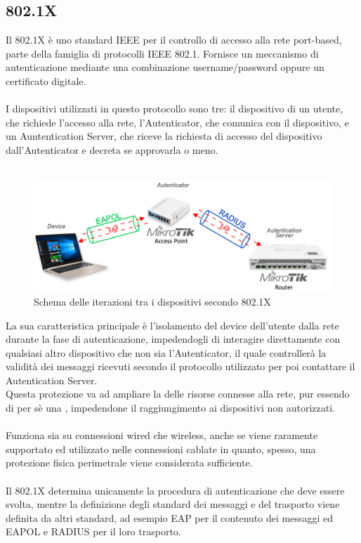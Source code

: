 \documentclass[Tesi.tex]{subfiles}
\begin{document}
\subsection{802.1X}
Il 802.1X è uno standard IEEE per il controllo di accesso alla rete port-based, parte della famiglia di protocolli IEEE 802.1. Fornisce un meccanismo di autenticazione mediante una combinazione username/password oppure un certificato digitale. \\\\
I dispositivi utilizzati in questo protocollo sono tre: il dispositivo di un utente, che richiede l'accesso alla rete, l'Autenticator, che comunica con il dispositivo, e un Auntentication Server, che riceve la richiesta di accesso del dispositivo dall'Autenticator e decreta se approvarla o meno. \\\\
\begin{figure}[H]
	\centering
	\includegraphics[width=1\linewidth]{"images/Schema_tecnologie"}
	\caption{Schema delle iterazioni tra i dispositivi secondo 802.1X}
	\label{fig:Schema delle iterazioni tra i dispositivi secondo 802.1X}
\end{figure}

La sua caratteristica principale è l'isolamento del device dell'utente dalla rete durante la fase di autenticazione, impedendogli di interagire direttamente con qualsiasi altro dispositivo che non sia l'Autenticator, il quale controllerà la validità dei messaggi ricevuti secondo il protocollo utilizzato per poi contattare il Autentication Server. \\
Questa protezione va ad ampliare la  delle risorse connesse alla rete, pur essendo di per sè una , impedendone il raggiungimento ai dispositivi non autorizzati. \\\\
Funziona sia su connessioni wired che wireless, anche se viene raramente supportato ed utilizzato nelle connessioni cablate in quanto, spesso, una protezione fisica perimetrale viene considerata sufficiente. \\\\
Il 802.1X determina unicamente la procedura di autenticazione che deve essere svolta, mentre la definizione degli standard dei messaggi e del trasporto viene definita da altri standard, ad esempio EAP per il contenuto dei messaggi ed EAPOL e RADIUS per il loro trasporto.
\end{document}
